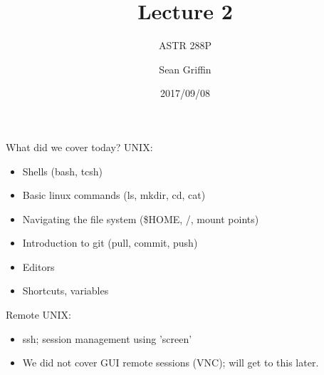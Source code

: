 \documentclass[10pt]{beamer}
\title{Lecture 2}
\subtitle{ASTR 288P}
\date{2017/09/08}
\author{Sean Griffin}
\institute{UMCP / NASA GSFC}
\begin{document}
\maketitle


\begin{frame}[fragile]{What did we cover today?}
UNIX:
	\begin{itemize}
        \item Shells (bash, tcsh)
        \item Basic linux commands (ls, mkdir, cd, cat)
        \item Navigating the file system (\$HOME, /, mount points)
        \item Introduction to git (pull, commit, push)
        \item Editors
        \item Shortcuts, variables
	\end{itemize}
Remote UNIX:
	\begin{itemize}
		\item ssh; session management using 'screen'
		\item We did not cover GUI remote sessions (VNC); will get to this later.
	\end{itemize}
\end{frame}
\end{document}
